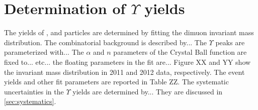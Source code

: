 % 

\section{Determination of $\Upsilon$ yields}
\label{sec:UpsilonFit}

The yields of \OneS, \TwoS and \ThreeS particles are determined by fitting the dimuon invariant mass distribution. The combinatorial background is described by... The $\Upsilon$ peaks 
are parameterized with... The $\alpha$ and $n$ parameters of the Crystal Ball function are fixed to... etc... the floating parameters in the fit are... 
Figure XX and YY show the invariant mass distribution in 2011 and 2012 data, respectively. The event yields and other fit parameters are reported in Table ZZ. 
The systematic uncertainties in the $\Upsilon$ yields are determined by... They are discussed in \ref{sec:systematics}.  